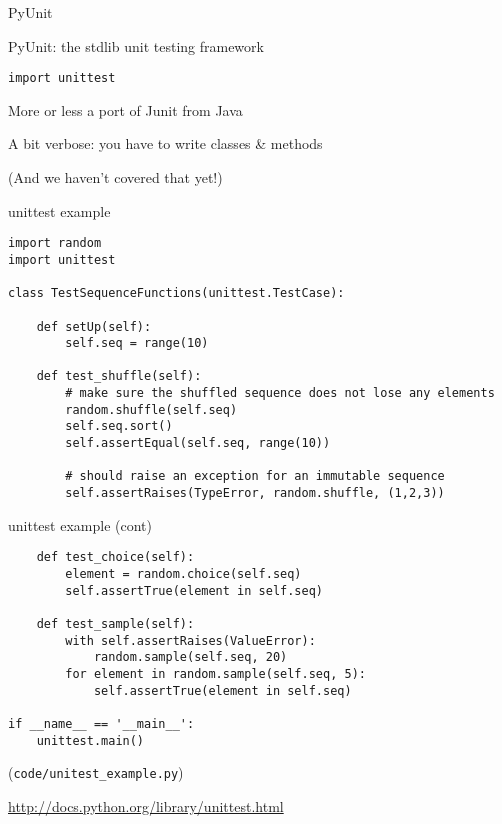 \documentclass{beamer}
\begin{document}
\begin{frame}[fragile]{PyUnit}

{\LARGE PyUnit: the stdlib unit testing framework}

\vfill
{\Large \verb|import unittest|}

\vfill
{\Large More or less a port of Junit from Java}

\vfill
{\Large A bit verbose: you have to write classes \& methods}

\vfill
{\large (And we haven't covered that yet!)}

\end{frame} 

\begin{frame}[fragile]{unittest example}

{\small
\begin{verbatim}
import random
import unittest

class TestSequenceFunctions(unittest.TestCase):

    def setUp(self):
        self.seq = range(10)

    def test_shuffle(self):
        # make sure the shuffled sequence does not lose any elements
        random.shuffle(self.seq)
        self.seq.sort()
        self.assertEqual(self.seq, range(10))

        # should raise an exception for an immutable sequence
        self.assertRaises(TypeError, random.shuffle, (1,2,3))
\end{verbatim}
}

\end{frame} 


\begin{frame}[fragile]{unittest example (cont)}

{\small
\begin{verbatim}
    def test_choice(self):
        element = random.choice(self.seq)
        self.assertTrue(element in self.seq)

    def test_sample(self):
        with self.assertRaises(ValueError):
            random.sample(self.seq, 20)
        for element in random.sample(self.seq, 5):
            self.assertTrue(element in self.seq)

if __name__ == '__main__':
    unittest.main()
\end{verbatim}
}

\vfill
(\verb|code/unitest_example.py|)

\vfill
\url{http://docs.python.org/library/unittest.html}

\end{frame} 
\end{document}
